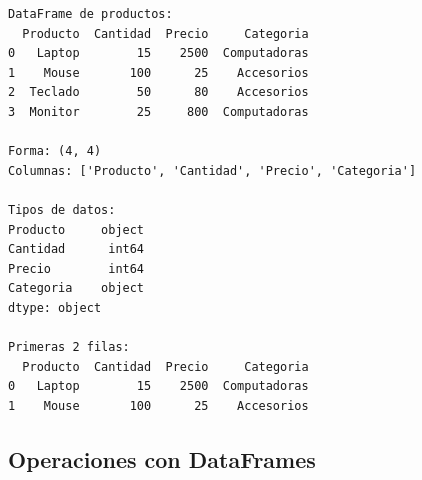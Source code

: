 \documentclass[
  doc,
  floatsintext,
  longtable,
  a4paper,
  nolmodern,
  notxfonts,
  notimes,
  12pt,
  colorlinks=true,linkcolor=blue,citecolor=blue,urlcolor=blue]{apa7}
\begin{document}
\begin{verbatim}
DataFrame de productos:
  Producto  Cantidad  Precio     Categoria
0   Laptop        15    2500  Computadoras
1    Mouse       100      25    Accesorios
2  Teclado        50      80    Accesorios
3  Monitor        25     800  Computadoras

Forma: (4, 4)
Columnas: ['Producto', 'Cantidad', 'Precio', 'Categoria']

Tipos de datos:
Producto     object
Cantidad      int64
Precio        int64
Categoria    object
dtype: object

Primeras 2 filas:
  Producto  Cantidad  Precio     Categoria
0   Laptop        15    2500  Computadoras
1    Mouse       100      25    Accesorios
\end{verbatim}

\subsection{Operaciones con
DataFrames}\label{operaciones-con-dataframes}
\end{document}
